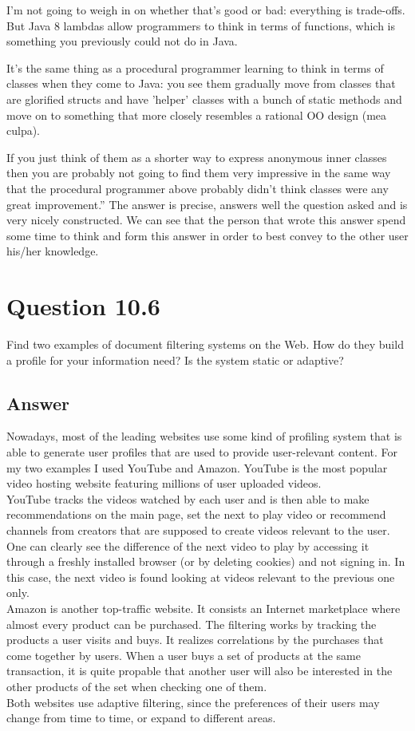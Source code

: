 \documentclass{article}
\begin{document}
I'm not going to weigh in on whether that's good or bad: everything is trade-offs. But Java 8 lambdas allow programmers to think in terms of functions, which is something you previously could not do in Java.

It's the same thing as a procedural programmer learning to think in terms of classes when they come to Java: you see them gradually move from classes that are glorified structs and have 'helper' classes with a bunch of static methods and move on to something that more closely resembles a rational OO design (mea culpa).

If you just think of them as a shorter way to express anonymous inner classes then you are probably not going to find them very impressive in the same way that the procedural programmer above probably didn't think classes were any great improvement.'' The answer is precise, answers well the question asked and is very nicely constructed. We can see that the person that wrote this answer spend some time to think and form this answer in order to best convey to the other user his/her knowledge.

\section*{Question 10.6}
Find two examples of document filtering systems on the Web. How do they build a profile for your information need? Is the system static or adaptive?
\subsection*{Answer}
Nowadays, most of the leading websites use some kind of profiling system that is able to generate user profiles that are used to provide user-relevant content. For my two examples I used YouTube and Amazon. YouTube is the most popular video hosting website featuring millions of user uploaded videos. \\YouTube tracks the videos watched by each user and is then able to make recommendations on the main page, set the next to play video or recommend channels from creators that are supposed to create videos relevant to the user. One can clearly see the difference of the next video to play by accessing it through a freshly installed browser (or by deleting cookies) and not signing in. In this case, the next video is found looking at videos relevant to the previous one only.
\\Amazon is another top-traffic website. It consists an Internet marketplace where almost every product can be purchased. The filtering works by tracking the products a user visits and buys. It realizes correlations by the purchases that come together by users. When a user buys a set of products at the same transaction, it is quite propable that another user will also be interested in the other products of the set when checking one of them.
\\Both websites use adaptive filtering, since the preferences of their users may change from time to time, or expand to different areas.
\end{document}
